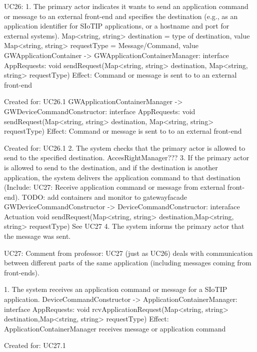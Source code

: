         UC26:
            1. The primary actor indicates it wants to send an application command or message to an external
                front-end and specifies the destination (e.g., as an application identifier for SIoTIP applications,
                or a hostname and port for external systems).
                Map<string, string> destination = type of destination, value
                Map<string, string> requestType = Message/Command, value
                GWApplicationContainer -> GWApplicationContainerManager: interface AppRequests:
                                                   void sendRequest(Map<string, string> destination, Map<string, string> requestType)
                       Effect: Command or message is sent to  to an external front-end
                       \item Created for: UC26.1
                GWApplicationContainerManager -> GWDeviceCommandConstructor: interface AppRequests:
                                                      void sendRequest(Map<string, string> destination, Map<string, string> requestType)
                         Effect: Command or message is sent to  to an external front-end
                       \item Created for: UC26.1
            2. The system checks that the primary actor is allowed to send to the specified destination.
            AccesRightManager???
            3. If the primary actor is allowed to send to the destination, and if the destination is another
                application, the system delivers the application command to that destination (Include: UC27:
                Receive application command or message from external front-end).
                TODO: add containers and monitor to gatewayfacade
                GWDeviceCommandConstructor -> DeviceCommandConstructor: interaface Actuation
                                        void sendRequest(Map<string, string> destination,Map<string, string> requestType)
                See UC27
            4. The system informs the primary actor that the message was sent.

       UC27:
       Comment from professor:
           UC27 (just as UC26) deals with communication between different parts of the same application (including messages coming from front-ends).

        1. The system receives an application command or message for a SIoTIP application.
            DeviceCommandConstructor -> ApplicationContainerManager: interface AppRequests:
                                                 void rcvApplicationRequest(Map<string, string> destination,Map<string, string> requestType)
                   Effect: ApplicationContainerManager receives message or application command
                   \item Created for: UC27.1

